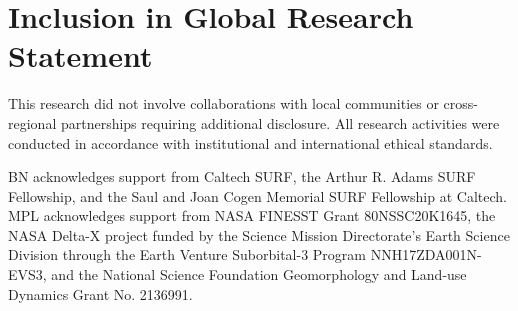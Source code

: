 \documentclass{agujournal2019}
\begin{document}
\section*{Inclusion in Global Research Statement}
This research did not involve collaborations with local communities or cross-regional partnerships requiring additional disclosure. All research activities were conducted in accordance with institutional and international ethical standards.

\acknowledgments
BN acknowledges support from Caltech SURF, the Arthur R. Adams SURF Fellowship, and the Saul and Joan Cogen Memorial SURF Fellowship at Caltech. MPL acknowledges support from NASA FINESST Grant 80NSSC20K1645, the NASA Delta-X project funded by the Science Mission Directorate's Earth Science Division through the Earth Venture Suborbital-3 Program NNH17ZDA001N-EVS3, and the National Science Foundation Geomorphology and Land-use Dynamics Grant No. 2136991.


\end{document}
